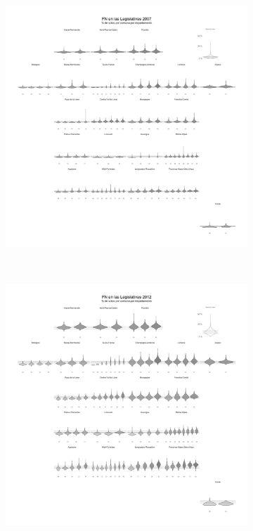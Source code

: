 \begin{figure}[h]
\begin{subfigure}{0.4\textwidth}
	\end{subfigure}
	~
	\begin{subfigure}{0.4\textwidth}
	\includegraphics[width = \textwidth]{Figs/AED/Geofacet_Distr_por_Dpto_L07_FN}
	\end{subfigure}
	~
	\begin{subfigure}{0.4\textwidth}
	\includegraphics[width = \textwidth]{Figs/AED/Geofacet_Distr_por_Dpto_L12_FN}

\end{subfigure}
\end{figure}
